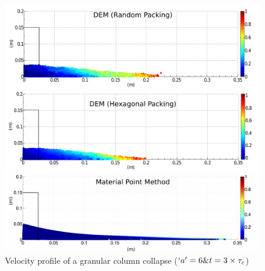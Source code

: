 \begin{figure}[tbhp]
\centering
\includegraphics[width=\textwidth]{a6f}
\caption{Velocity profile of a granular column collapse ($`a' = 6 \& 
t=3\times\tau_c$)}
\label{fig:a6f}
\end{figure}
